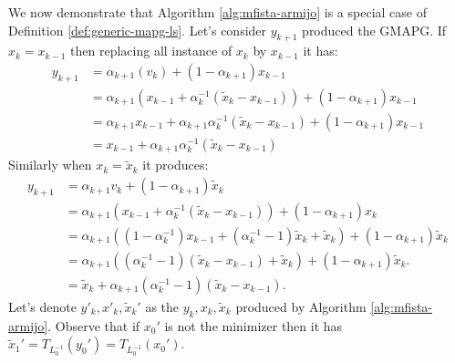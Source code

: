\documentclass[12pt]{report}
\begin{document}
\begin{example}
            We now demonstrate that Algorithm \ref{alg:mfista-armijo} is a special case of Definition \ref{def:generic-mapg-ls}.
            Let's consider $y_{k + 1}$ produced the GMAPG. 
            If $x_k = x_{k - 1}$ then replacing all instance of $x_k$ by $x_{k - 1}$ it has: 
            \begin{align*}
                y_{k + 1} &= \alpha_{k + 1}(v_k) + (1 - \alpha_{k + 1})x_{k - 1}
                \\
                &= \alpha_{k + 1}(x_{k - 1} + \alpha_k^{-1}(\tilde x_k - x_{k - 1})) + (1 - \alpha_{k + 1})x_{k - 1}
                \\
                &= \alpha_{k + 1} x_{k - 1} + \alpha_{k + 1}\alpha_k^{-1}(\tilde x_k - x_{k - 1}) + (1 - \alpha_{k + 1}) x_{k - 1}
                \\
                &= x_{k - 1} + \alpha_{k + 1}\alpha_k^{-1}(\tilde x_k - x_{k - 1})
            \end{align*}
            Similarly when $x_k = \tilde x_k$ it produces: 
            \begin{align*}
                y_{k + 1} &= 
                \alpha_{k + 1}v_k + (1 - \alpha_{k + 1})\tilde x_k
                \\
                &= 
                \alpha_{k + 1}(x_{k - 1} + \alpha_k^{-1}(\tilde x_k - x_{k - 1})) + (1 - \alpha_{k + 1})x_k
                \\
                &= 
                \alpha_{k + 1}\left(
                    (1 - \alpha_{k}^{-1})x_{k - 1} + (\alpha_k^{-1} - 1)\tilde x_k + \tilde x_k
                \right) + 
                (1 - \alpha_{k + 1})\tilde x_k
                \\
                &= 
                \alpha_{k + 1}\left(
                    (\alpha_k^{-1} - 1)(\tilde x_k - x_{k - 1}) + \tilde x_k
                \right) + 
                (1 - \alpha_{k + 1})\tilde x_k. 
                \\
                &= \tilde x_k + \alpha_{k + 1}(\alpha_k^{-1} - 1)(\tilde x_k - x_{k - 1}). 
            \end{align*}
            Let's denote $y'_{k}, x'_{k}, \tilde x_k'$ as the $y_k, x_k, \tilde x_k$ produced by Algorithm \ref{alg:mfista-armijo}.
            Observe that if $x_0'$ is not the minimizer then it has $\tilde x_1' = T_{L_0^{-1}}(y_0') = T_{L_0^{-1}}(x_0')$. 

\end{example}
\end{document}

